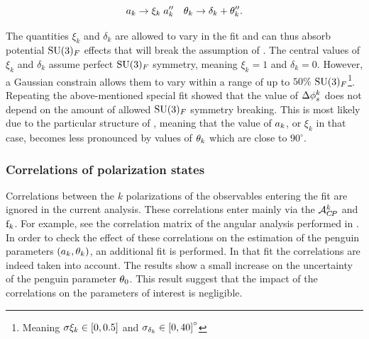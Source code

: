 \begin{equation}
  \centering
  \akPeng \to \xi_k \; \akPeng'' \quad \thkPeng \to \delta_k + \thkPeng''.
\label{su3_breaking_invoke}
\end{equation}

\noindent The quantities $\xi_k$ and $\delta_k$ are allowed to vary in the fit and can thus absorb
potential $\mathrm{SU}(3)_F$ effects that will break the assumption of .
The central values of $\xi_k$ and $\delta_k$ assume perfect $\mathrm{SU}(3)_F$ symmetry, meaning $\xi_k=1$ and $\delta_k=0$.
However, a Gaussian constrain allows them to vary within a range of up to $50\%$
$\mathrm{SU}(3)_F$\footnote{Meaning $\sigma{\xi_k}\in\left[ 0,0.5 \right]$ and $\sigma_{\delta_k}\in\left[ 0,40 \right]^\circ$ }.
Repeating the above-mentioned special fit showed that the value of $\Delta\phi_{s}^{k}$
does not depend on the amount of allowed $\mathrm{SU}(3)_F$ symmetry breaking.
This is most likely due to the particular structure of , meaning that
the value of $a_k$, or $\xi_k$ in that case, becomes less pronounced by values of
$\theta_k$ which are close to $90^\circ$.

\subsubsection{Correlations of polarization states}
Correlations between the $k$ polarizations of the observables entering the \chisq fit are ignored in the
current analysis. These correlations enter mainly via the $\mathcal{A}_{C\!P}^{k}$ and $\text{f}_{k}$. For example, see the
correlation matrix  of the angular analysis performed in .
In order to check the effect of these correlations on the estimation of the penguin parameters $(a_k,\theta_k)$,
an additional \chisq fit is performed. In that fit the correlations are indeed taken into account.
The results show a small increase on the uncertainty of the penguin parameter $\theta_{0}$.
This result suggest that the impact of the correlations on the parameters of interest is negligible.
